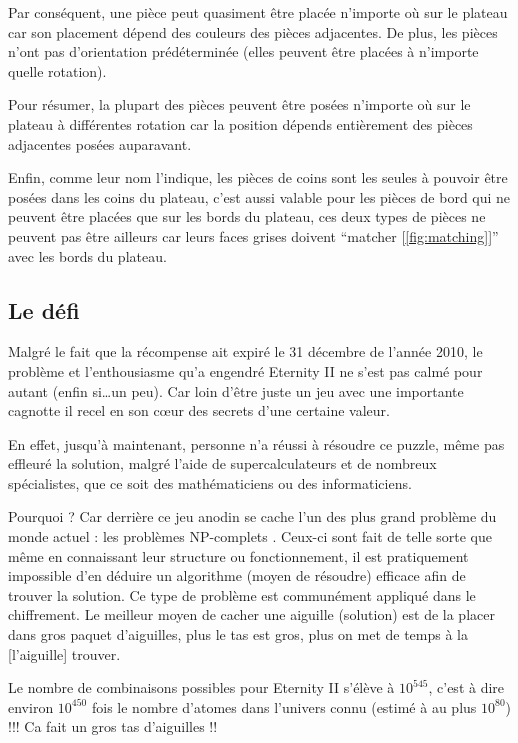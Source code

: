 	Par conséquent, une pièce peut quasiment être placée n'importe où sur le plateau car son placement dépend des couleurs des pièces adjacentes. De plus, les pièces n'ont pas d'orientation prédéterminée (elles peuvent être placées à n'importe quelle rotation).
	
	Pour résumer, la plupart des pièces peuvent être posées n'importe où sur le plateau à différentes rotation car la position dépends entièrement des pièces adjacentes posées auparavant. 
	
	Enfin, comme leur nom l'indique, les pièces de coins sont les seules à pouvoir être posées dans les coins du plateau, c'est aussi valable pour les pièces de bord qui ne peuvent être placées que sur les bords du plateau, ces deux types de pièces ne peuvent pas être ailleurs car leurs faces grises doivent \enquote{matcher [\autoref{fig:matching}]} avec les bords du plateau.
	
	\newpage
	\subsection{Le défi}
	
	Malgré le fait que la récompense ait expiré le 31 décembre de l'année 2010, le problème et l'enthousiasme qu'a engendré Eternity II ne s'est pas calmé pour autant (enfin si\dots un peu). Car loin d'être juste un jeu avec une importante cagnotte il recel en son c\oe ur des secrets d'une certaine valeur.
	
	En effet, jusqu'à maintenant, personne n'a réussi à résoudre ce puzzle, même pas effleuré la solution, malgré l'aide de supercalculateurs et de nombreux spécialistes, que ce soit des mathématiciens ou des informaticiens.
	
	Pourquoi ? Car derrière ce jeu anodin se cache l'un des plus grand problème du monde actuel : les problèmes NP-complets \autocite{wiki:np_complet}. Ceux-ci sont fait de telle sorte que même en connaissant leur structure ou fonctionnement, il est pratiquement impossible d'en déduire un algorithme (moyen de résoudre) efficace afin de trouver la solution. Ce type de problème est communément appliqué dans le chiffrement. Le meilleur moyen de cacher une aiguille (solution) est de la placer dans gros paquet d'aiguilles, plus le tas est gros, plus on met de temps à la [l'aiguille] trouver.
	
	\begin{exmp}
		Le nombre de combinaisons possibles pour Eternity II s'élève à $10^{545}$, c'est à dire environ $10^{450}$ fois le nombre d'atomes dans l'univers connu (estimé à au plus $10^{80}$) !!! Ca fait un gros tas d'aiguilles !!
	\end{exmp}
	

